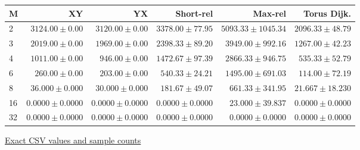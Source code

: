 \begin{center}{\scriptsize\setlength{\tabcolsep}{3pt}
\begin{tabular}{lrrrrr}
\toprule
M & XY & YX & Short-rel & Max-rel & Torus Dijk. \\
\midrule
2 & $3124.00\pm0.00$ & $3120.00\pm0.00$ & $3378.00\pm77.95$ & $5093.33\pm1045.34$ & $2096.33\pm48.79$ \\
3 & $2019.00\pm0.00$ & $1969.00\pm0.00$ & $2398.33\pm89.20$ & $3949.00\pm992.16$ & $1267.00\pm42.23$ \\
4 & $1011.00\pm0.00$ & $946.00\pm0.00$ & $1472.67\pm97.39$ & $2866.33\pm946.75$ & $535.33\pm52.79$ \\
6 & $260.00\pm0.00$ & $203.00\pm0.00$ & $540.33\pm24.21$ & $1495.00\pm691.03$ & $114.00\pm72.19$ \\
8 & $36.000\pm0.000$ & $30.000\pm0.000$ & $181.67\pm49.07$ & $661.33\pm341.95$ & $21.667\pm18.230$ \\
16 & $0.0000\pm0.0000$ & $0.0000\pm0.0000$ & $0.0000\pm0.0000$ & $23.000\pm39.837$ & $0.0000\pm0.0000$ \\
32 & $0.0000\pm0.0000$ & $0.0000\pm0.0000$ & $0.0000\pm0.0000$ & $0.0000\pm0.0000$ & $0.0000\pm0.0000$ \\
\bottomrule\end{tabular}}
{\footnotesize\href{https://github.com/sanjeevkrishnaa/Compiler-Driven-ACE/blob/codex/ace-scheduler-correctness/docs/latex/qft96_final/data/congestion_overview.csv}{Exact CSV values and sample counts}}
\end{center}